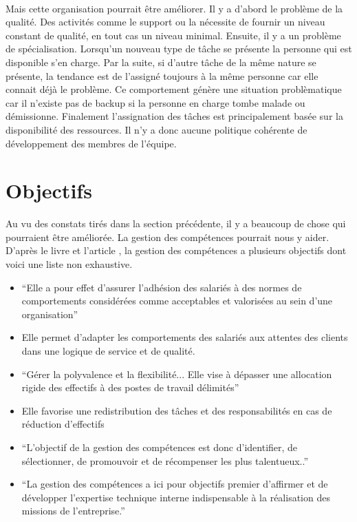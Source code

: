\paragraph{}Mais cette organisation pourrait être améliorer. Il y a d'abord le problème de la qualité. Des activités comme le support ou la nécessite de fournir un niveau constant de qualité, en tout cas un niveau minimal. Ensuite, il y a un problème de spécialisation. Lorsqu'un nouveau type de tâche se présente la personne qui est disponible s'en charge. Par la suite, si d'autre tâche de la même nature se présente, la tendance est de l'assigné toujours à la même personne car elle connait déjà le problème. Ce comportement génère une situation problèmatique car il n'existe pas de backup si la personne en charge tombe malade ou démissionne. 
Finalement l'assignation des tâches est principalement basée sur la disponibilité des ressources. Il n'y a donc aucune politique cohérente de développement des membres de l'équipe. 



\section{Objectifs}
Au vu des constats tirés dans la section précédente, il y a beaucoup de chose qui pourraient être améliorée. La gestion des compétences pourrait nous y aider. D'après le livre\citep{gestionressourceshumaine2007} et l'article \citep{delobbe}, la gestion des compétences a plusieurs objectifs dont voici une liste non exhaustive.
\begin{itemize}
    \item \enquote{Elle a pour effet d'assurer l'adhésion des salariés à des normes de comportements considérées comme acceptables et valorisées au sein d'une organisation}\citep[p.40]{delobbe}
    \item Elle permet d'adapter les comportements des salariés aux attentes des clients dans une logique de service et de qualité. \citep[182]{gestionressourceshumaine2007}
    \item \enquote{Gérer la polyvalence et la flexibilité... Elle vise à dépasser une allocation rigide des effectifs à des postes de travail délimités}\citep[p.41]{delobbe}
    \item Elle favorise une redistribution des tâches et des responsabilités en cas de réduction d'effectifs \citep[182]{gestionressourceshumaine2007}
    \item  \enquote{L'objectif de la gestion des compétences est donc d'identifier, de sélectionner, de promouvoir et de récompenser les plus talentueux..}\citep[p.43]{delobbe}
    \item  \enquote{La gestion des compétences a ici pour objectifs premier d'affirmer et de développer l'expertise technique interne indispensable à la réalisation des missions de l'entreprise.} \citep[p.45]{delobbe}

\end{itemize}
           
